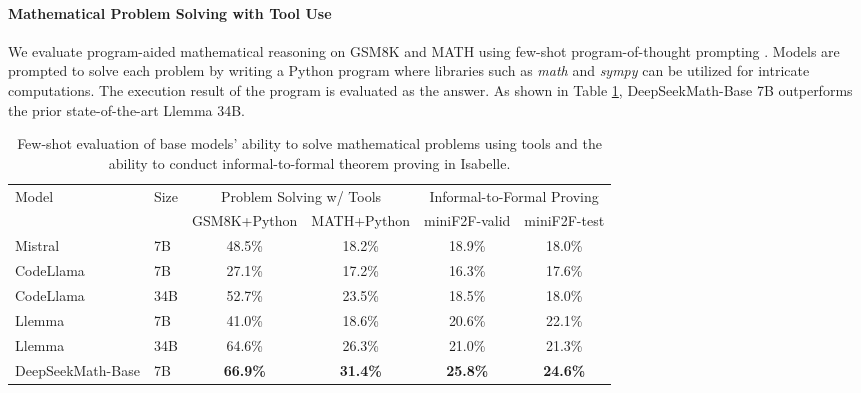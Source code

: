 \documentclass[11pt, a4paper, logo, copyright, nonumbering]{deepseek}
\newcommand{\spmath}{DeepSeekMath}
\begin{document}
\begin{CJK*}{UTF8}{gbsn}
\paragraph{Mathematical Problem Solving with Tool Use}
We evaluate program-aided mathematical reasoning on GSM8K and MATH using few-shot program-of-thought prompting \citep{pot,pal}.
Models are prompted to solve each problem by writing a Python program where libraries such as \textit{math} and \textit{sympy} can be utilized for intricate computations.
The execution result of the program is evaluated as the answer.
As shown in Table \ref{tab:base_math_pot_proof}, \spmath-Base 7B outperforms the prior state-of-the-art Llemma 34B.

\begingroup
\setlength{\tabcolsep}{3pt} %
\renewcommand{\arraystretch}{1} %
\begin{table}[htb]
    \centering
\begin{small}
\begin{tabular}{llcccc} 
\toprule
\multicolumn{1}{l}{\multirow{2}{*}{Model}}  & \multicolumn{1}{l}{\multirow{2}{*}{Size}} &\multicolumn{2}{c}{Problem Solving w/ Tools}                                                             & \multicolumn{2}{c}{Informal-to-Formal Proving}           \\ \cmidrule(lr){3-4}\cmidrule(lr){5-6}
& & GSM8K+Python           & MATH+Python     & miniF2F-valid    & miniF2F-test    \\ 
\midrule
Mistral & 7B                           & 48.5\%          & 18.2\%       &      18.9\%         &  18.0\%          \\ 
\midrule
CodeLlama & 7B    & 27.1\%          & 17.2\%       & 16.3\%        & 17.6\%         \\
CodeLlama& 34B                                 & 52.7\%          & 23.5\%      & 18.5\%        & 18.0\%       \\ 
\midrule
Llemma & 7B  & 41.0\%          & 18.6\%     & 20.6\%        & 22.1\%        \\
Llemma& 34B                                 & 64.6\% & 26.3\%      & 21.0\%        & 21.3\%         \\ 
\midrule
\spmath-Base & 7B                & \textbf{66.9\%}          & \textbf{31.4\%}  & \textbf{25.8\%}        & \textbf{24.6\%}    \\
\bottomrule
\end{tabular}
\end{small}
    \caption{
    Few-shot evaluation of base models' ability to solve mathematical problems using tools and the ability to conduct informal-to-formal theorem proving in Isabelle.
    }
    \label{tab:base_math_pot_proof}
\end{table}
\endgroup



\end{CJK*}
\end{document}
